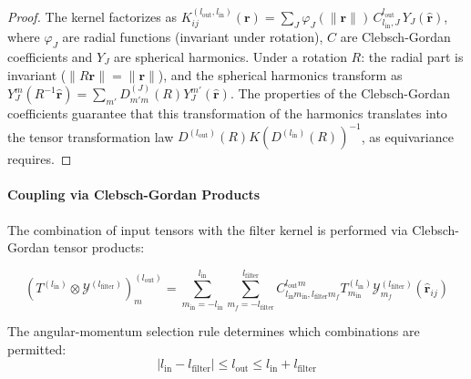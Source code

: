 \begin{proof}
The kernel factorizes as $K_{ij}^{(l_{\text{out}}, l_{\text{in}})}(\mathbf{r}) = \sum_{J} \varphi_J(\|\mathbf{r}\|) \, C^{l_{\text{out}}}_{l_{\text{in}}, J} \, Y_J(\hat{\mathbf{r}})$, where $\varphi_J$ are radial functions (invariant under rotation), $C$ are Clebsch-Gordan coefficients and $Y_J$ are spherical harmonics. Under a rotation $R$: the radial part is invariant ($\|R\mathbf{r}\| = \|\mathbf{r}\|$), and the spherical harmonics transform as $Y_J^m(R^{-1}\hat{\mathbf{r}}) = \sum_{m'} D_{m'm}^{(J)}(R) Y_J^{m'}(\hat{\mathbf{r}})$. The properties of the Clebsch-Gordan coefficients guarantee that this transformation of the harmonics translates into the tensor transformation law $D^{(l_{\text{out}})}(R) K (D^{(l_{\text{in}})}(R))^{-1}$, as equivariance requires.
\end{proof}

\paragraph{Coupling via Clebsch-Gordan Products}

The combination of input tensors with the filter kernel is performed via Clebsch-Gordan tensor products:

\begin{equation}\label{eq:tfn_cg_coupling}
(T^{(l_{\text{in}})} \otimes \mathcal{Y}^{(l_{\text{filter}})})^{(l_{\text{out}})}_m = \sum_{m_{\text{in}}=-l_{\text{in}}}^{l_{\text{in}}} \sum_{m_f=-l_{\text{filter}}}^{l_{\text{filter}}} C_{l_{\text{in}} m_{\text{in}}, l_{\text{filter}} m_f}^{l_{\text{out}} m} T^{(l_{\text{in}})}_{m_{\text{in}}} \mathcal{Y}^{(l_{\text{filter}})}_{m_f}(\hat{\mathbf{r}}_{ij})
\end{equation}

The angular-momentum selection rule determines which combinations are permitted:
\begin{equation}
|l_{\text{in}} - l_{\text{filter}}| \leq l_{\text{out}} \leq l_{\text{in}} + l_{\text{filter}}
\end{equation}

